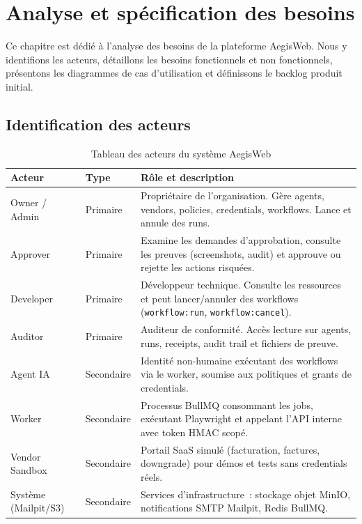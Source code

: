 \chapter{Analyse et spécification des besoins}

\begin{chapintro}
Ce chapitre est dédié à l'analyse des besoins de la plateforme AegisWeb.
Nous y identifions les acteurs, détaillons les besoins fonctionnels et
non fonctionnels, présentons les diagrammes de cas d'utilisation et
définissons le backlog produit initial.
\end{chapintro}

\section{Identification des acteurs}

\begin{table}[H]
\centering
\caption{Tableau des acteurs du système AegisWeb}
\label{tab:acteurs}
\begin{tabularx}{\textwidth}{@{}llX@{}}
\toprule
\textbf{Acteur}             & \textbf{Type}   & \textbf{Rôle et description} \\
\midrule
\rowcolor{rowgray}
Owner / Admin               & Primaire
  & Propriétaire de l'organisation. Gère agents, vendors, policies,
    credentials, workflows. Lance et annule des runs. \\
Approver                    & Primaire
  & Examine les demandes d'approbation, consulte les preuves (screenshots,
    audit) et approuve ou rejette les actions risquées. \\
\rowcolor{rowgray}
Developer                   & Primaire
  & Développeur technique. Consulte les ressources et peut lancer/annuler
    des workflows (\texttt{workflow:run}, \texttt{workflow:cancel}). \\
Auditor                     & Primaire
  & Auditeur de conformité. Accès lecture sur agents, runs, receipts,
    audit trail et fichiers de preuve. \\
\rowcolor{rowgray}
Agent IA                    & Secondaire
  & Identité non-humaine exécutant des workflows via le worker, soumise
    aux politiques et grants de credentials. \\
Worker                      & Secondaire
  & Processus BullMQ consommant les jobs, exécutant Playwright et
    appelant l'API interne avec token HMAC scopé. \\
\rowcolor{rowgray}
Vendor Sandbox              & Secondaire
  & Portail SaaS simulé (facturation, factures, downgrade) pour démos
    et tests sans credentials réels. \\
Système (Mailpit/S3)        & Secondaire
  & Services d'infrastructure~: stockage objet MinIO, notifications SMTP
    Mailpit, Redis BullMQ. \\
\bottomrule
\end{tabularx}
\end{table}

